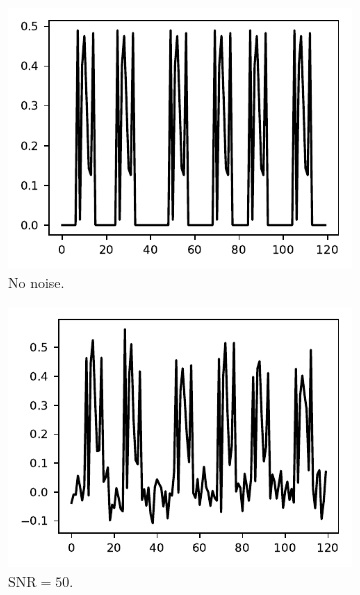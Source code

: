 \documentclass{article}
\begin{document}
\begin{figure}[!tb]
	\begin{subfigure}[ht]{0.33\textwidth}
		\centering
		\includegraphics[width=\columnwidth]{figures/y_clean.pdf}
		\caption{No noise.}
	\end{subfigure}
	\hfill
	\begin{subfigure}[ht]{0.33\textwidth}
		\centering
		\includegraphics[width=\columnwidth]{figures/y_SNR50.pdf}
		\caption{$\text{SNR} = 50$.}
	\end{subfigure}
	\hfill
	\begin{subfigure}[ht]{0.33\textwidth}
		\centering

\end{subfigure}
\end{figure}
\end{document}

